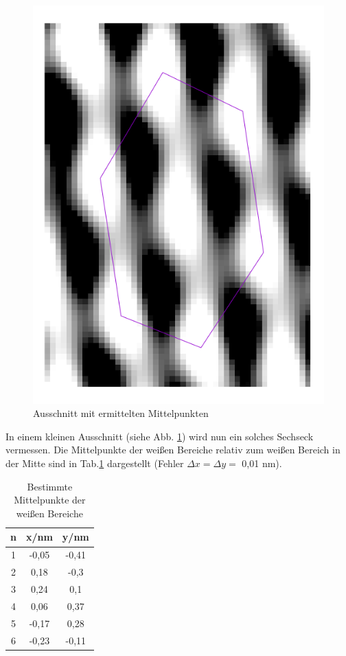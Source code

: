 \begin{figure}
\centering
\includegraphics[scale=0.35]{data/graphit/graphit.png}
\caption{Ausschnitt mit ermittelten Mittelpunkten}
\label{fig:small}
\end{figure}

In einem kleinen Ausschnitt (siehe Abb. \ref{fig:small}) wird nun ein solches Sechseck vermessen. Die Mittelpunkte der weißen Bereiche relativ zum weißen Bereich in der Mitte sind in Tab.\ref{tab:points} dargestellt (Fehler $\Delta x=\Delta y=$ 0,01 nm).

\newpage

\begin{table}
\centering
\begin{tabular}{ccc}
\toprule
n & x/nm & y/nm\\
\midrule
1 & -0,05 &-0,41\\
2 & 0,18&	-0,3\\
3 & 0,24&	0,1\\
4 & 0,06&	0,37\\
5 & -0,17&	0,28\\
6 & -0,23&	-0,11\\
\bottomrule
\end{tabular}
\caption{Bestimmte Mittelpunkte der weißen Bereiche}
\label{tab:points}
\end{table}
 
